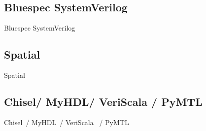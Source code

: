 %
\subsection{Bluespec SystemVerilog}
Bluespec SystemVerilog~\cite{bluespec}
% 

\subsection{Spatial}
Spatial~\cite{david_PLDI_2018_spatial, prabhakar_asplos_2016_parallelpattern}


\subsection{Chisel/ MyHDL/ VeriScala / PyMTL}
Chisel~\cite{bachrach_dac_2012_chisel}/ MyHDL~\cite{decaluwe_2004_myhdl}/ VeriScala~\cite{liu_2017_scala} / PyMTL~\cite{lockhart_ISCA_2014_pymtl}
%

